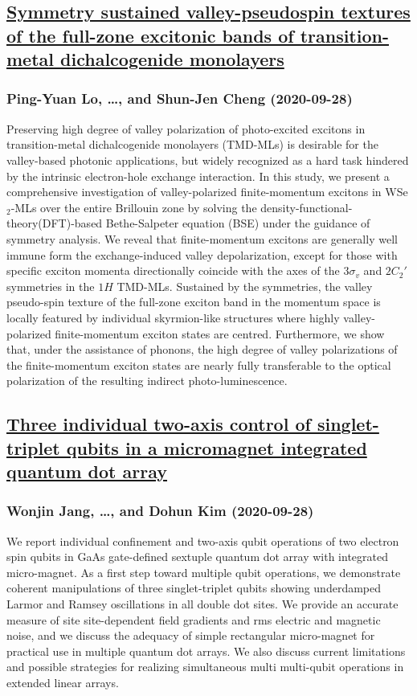 \subsection*{\href{http://arxiv.org/abs/2009.13183v1}{Symmetry sustained valley-pseudospin textures of the full-zone excitonic  bands of transition-metal dichalcogenide monolayers}}
\subsubsection*{Ping-Yuan Lo, \dots, and Shun-Jen Cheng (2020-09-28)}
Preserving high degree of valley polarization of photo-excited excitons in
transition-metal dichalcogenide monolayers (TMD-MLs) is desirable for the
valley-based photonic applications, but widely recognized as a hard task
hindered by the intrinsic electron-hole exchange interaction. In this study, we
present a comprehensive investigation of valley-polarized finite-momentum
excitons in WSe$_2$-MLs over the entire Brillouin zone by solving the
density-functional-theory(DFT)-based Bethe-Salpeter equation (BSE) under the
guidance of symmetry analysis. We reveal that finite-momentum excitons are
generally well immune form the exchange-induced valley depolarization, except
for those with specific exciton momenta directionally coincide with the axes of
the $3\sigma_v$ and $2C_2'$ symmetries in the $1H$ TMD-MLs. Sustained by the
symmetries, the valley pseudo-spin texture of the full-zone exciton band in the
momentum space is locally featured by individual skyrmion-like structures where
highly valley-polarized finite-momentum exciton states are centred.
Furthermore, we show that, under the assistance of phonons, the high degree of
valley polarizations of the finite-momentum exciton states are nearly fully
transferable to the optical polarization of the resulting indirect
photo-luminescence.

\subsection*{\href{http://arxiv.org/abs/2009.13182v1}{Three individual two-axis control of singlet-triplet qubits in a  micromagnet integrated quantum dot array}}
\subsubsection*{Wonjin Jang, \dots, and Dohun Kim (2020-09-28)}
We report individual confinement and two-axis qubit operations of two
electron spin qubits in GaAs gate-defined sextuple quantum dot array with
integrated micro-magnet. As a first step toward multiple qubit operations, we
demonstrate coherent manipulations of three singlet-triplet qubits showing
underdamped Larmor and Ramsey oscillations in all double dot sites. We provide
an accurate measure of site site-dependent field gradients and rms electric and
magnetic noise, and we discuss the adequacy of simple rectangular micro-magnet
for practical use in multiple quantum dot arrays. We also discuss current
limitations and possible strategies for realizing simultaneous multi
multi-qubit operations in extended linear arrays.

